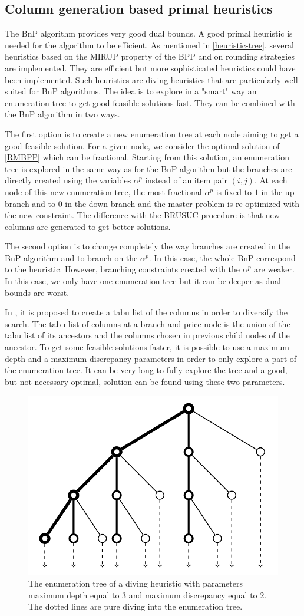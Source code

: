 \subsection{Column generation based primal heuristics}
\label{diving}

The BnP algorithm provides very good dual bounds. A good primal heuristic is needed for the algorithm to be efficient. As mentioned in \ref{heuristic-tree}, several heuristics based on the MIRUP property of the BPP and on rounding strategies are implemented. They are efficient but more sophisticated heuristics could have been implemented. Such heuristics are diving heuristics that are particularly well suited for BnP algorithms. The idea is to explore in a "smart" way an enumeration tree to get good feasible solutions fast. They can be combined with the BnP algorithm in two ways.

The first option is to create a new enumeration tree at each node aiming to get a good feasible solution. For a given node, we consider the optimal solution of \eqref{RMBPP} which can be fractional. Starting from this solution, an enumeration tree is explored in the same way as for the BnP algorithm but the branches are directly created using the variables $\alpha^p$ instead of an item pair $(i,j)$. At each node of this new enumeration tree, the most fractional $\alpha^p$ is fixed to $1$ in the up branch and to $0$ in the down branch and the master problem is re-optimized with the new constraint. The difference with the BRUSUC procedure is that new columns are generated to get better solutions.

The second option is to change completely the way branches are created in the BnP algorithm and to branch on the $\alpha^p$. In this case, the whole BnP correspond to the heuristic. However, branching constraints created with the $\alpha^p$ are weaker. In this case, we only have one enumeration tree but it can be deeper as dual bounds are worst.

In \cite{sadykov2013bin}, it is proposed to create a tabu list of the columns in order to diversify the search. The tabu list of columns at a branch-and-price node is the union of the tabu list of its ancestors and the columns chosen in previous child nodes of the ancestor. To get some feasible solutions faster, it is possible to use a maximum depth and a maximum discrepancy parameters in order to only explore a part of the enumeration tree. It can be very long to fully explore the tree and a good, but not necessary optimal, solution can be found using these two parameters.


\begin{figure}[!ht]
	\centering
	\includegraphics[width=0.4\linewidth]{img/diving.png}
	\caption{The enumeration tree of a diving heuristic with parameters maximum depth equal to 3 and maximum discrepancy equal to 2. The dotted lines are pure diving into the enumeration tree.}
\end{figure}